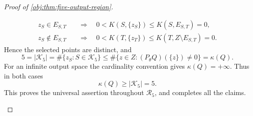 \documentclass[11pt]{article}
\begin{document}
\begin{proof}[Proof of \cref{obj:thm:five-output-region}]
\begin{enumerate}
\[\begin{aligned}
z_S\in E_{S,T}
&\quad\Longrightarrow\quad
0<K(S,\{z_S\})\le K(S,E_{S,T})=0,\\
z_S\notin E_{S,T}
&\quad\Longrightarrow\quad
0<K(T,\{z_T\})\le K(T,Z\setminus E_{S,T})=0.
\end{aligned}
\]
Hence the selected points are distinct, and
\[
5=|\mathcal K_5|
=\#\{z_S:S\in\mathcal K_5\}
\le\#\{z\in Z:(P_\theta Q)(\{z\})\ne0\}
=\kappa(Q).
\]
For an infinite output space the cardinality convention gives
\(\kappa(Q)=+\infty\). Thus in both cases
\[
\kappa(Q)\ge|\mathcal K_5|=5.
\]
This proves the universal assertion throughout \(\mathcal R_5\), and
completes all the claims.
\end{enumerate}
\end{proof}
\end{document}
